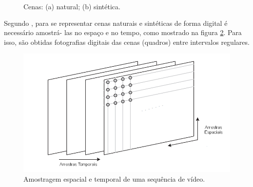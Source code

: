 \begin{figure}[h]
    \centering
    \qquad
    \caption{Cenas: (a) natural; (b) sintética.}%
	    
    \label{fig:RGB}%
\end{figure}

Segundo \cite{garcia2013tecnicas}, para se representar cenas naturais e sintéticas de forma digital é necessário amostrá- las no espaço e no tempo, como mostrado na figura \ref{AMOSTRAGEM_VIDEO}. Para isso, são obtidas fotografias digitais das cenas (quadros) entre intervalos regulares.

\begin{figure}[h]
	\centering
	\includegraphics[scale=0.65]{figuras/AMOSTRAGEM_VIDEO.png}
	\caption{Amostragem espacial e temporal de uma sequência de vídeo.}
	\label{AMOSTRAGEM_VIDEO}
\end{figure}


